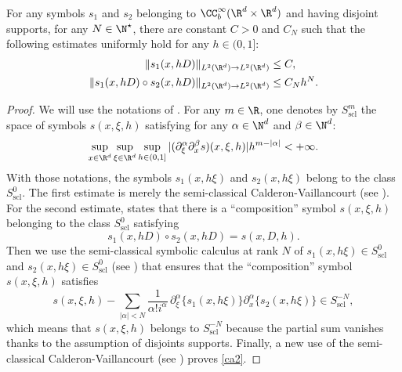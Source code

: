 \begin{lemm}\label{lem-sc}
For any symbols $s_1$ and $s_2$ belonging to $\CC_b^\infty(\R^d\times \R^d)$ and having disjoint supports, for any $N\in \N^\star$, there are constant $C>0$ and $C_N$ such that the following estimates uniformly hold for any $h\in (0,1]$:
\begin{align}\label{ca1}
\| s_1(x,hD)\|_{L^2(\R^d)\to L^2(\R^d)} &\leq C, \\ \label{ca2}
\| s_1(x,hD)\circ s_2(x,hD)\|_{L^2(\R^d)\to L^2(\R^d)} & \leq C_N h^N.
\end{align}
\end{lemm}
\begin{proof}
We will use the notations of \cite[p.\,22--23]{lerner-pseudo}. For any $m\in \R$, one denotes by $S_{\operatorname{scl}}^m$ the space of symbols $s(x,\xi,h)$ satisfying for any $\alpha \in \N^d$ and $\beta \in \N^d$:
\begin{equation*}
\sup_{x\in \R^d} \sup_{\xi\in \R^d}\sup_{h\in (0,1]}|(\partial_\xi^\alpha \partial_x^\beta s)(x,\xi,h)| h^{m-|\alpha|}<+\infty.
\end{equation*}
With those notations, the symbols $s_1(x,h\xi)$ and $s_2(x,h\xi)$ belong to the class $S_{\operatorname{scl}}^0$.
The first estimate is merely the semi-classical Calderon-Vaillancourt (see \cite[Th.\,1.1.30]{lerner-pseudo}).
For the second estimate, \cite[Th.\,1.1.31]{lerner-pseudo} states that there is a ``composition'' symbol $s(x,\xi,h)$ belonging to the class $S_{\operatorname{scl}}^0$ satisfying
\begin{equation*}
s_1(x,hD)\circ s_2(x,hD)=s(x,D,h).
\end{equation*}
Then we use the semi-classical symbolic calculus at rank $N$ of $s_1(x,h\xi)\in S_{\operatorname{scl}}^0$ and $s_2(x,h\xi)\in S_{\operatorname{scl}}^0$ (see \cite[Th.\,1.1.32]{lerner-pseudo}) that ensures that the ``composition'' symbol $s(x,\xi,h)$ satisfies
\begin{equation*}
s(x,\xi,h) - \sum_{|\alpha|<N} \frac{1}{\alpha! i^\alpha}\, \partial_\xi^{\alpha} \{s_1(x,h\xi)\} \partial_x^{\alpha}\{s_2(x,h\xi)\} \in S_{\operatorname{scl}}^{-N},
\end{equation*}
which means that $s(x,\xi,h)$ belongs to $S_{\operatorname{scl}}^{-N}$ because the partial sum
vanishes thanks to the assumption of disjoints supports.
Finally, a new use of the semi-classical Calderon-Vaillancourt (see \cite[Th.\,1.1.30]{lerner-pseudo}) proves \eqref{ca2}.
\end{proof}

